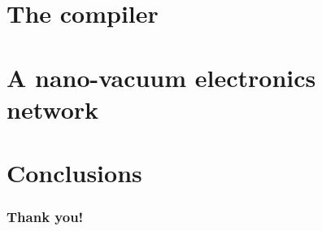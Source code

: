 \documentclass{beamer}
\begin{document}
\section{The compiler}

\section{A nano-vacuum electronics network}

\section{Conclusions}


\begin{frame}
  \frametitle{Thank you!}
\end{frame}
\end{document}
